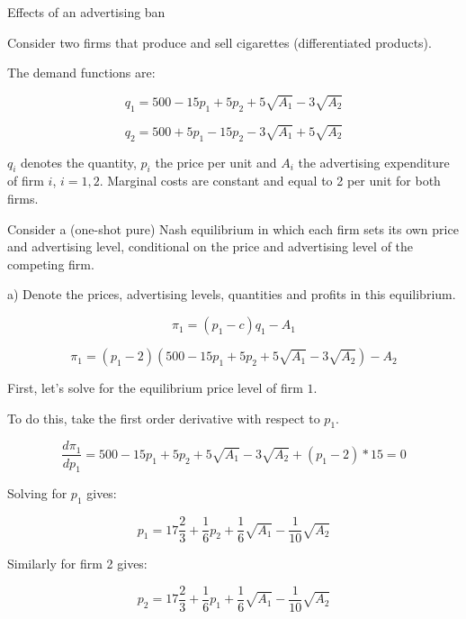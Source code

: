 \documentclass[12pt,english]{article}%
\begin{document}
Effects of an advertising ban

Consider two firms that produce and sell cigarettes (differentiated products).

The demand functions are:

\begin{equation}
q_1=500-15p_1+5p_2+5\sqrt{A_1}-3\sqrt{A_2}
\end{equation}

\begin{equation}
q_2=500+5p_1-15p_2-3\sqrt{A_1}+5\sqrt{A_2}
\end{equation}

$q_i$ denotes the quantity, $p_i$ the price per unit and $A_i$ the advertising expenditure of firm $i$, $i=1,2$.
Marginal costs are constant and equal to 2 per unit for both firms. 

Consider a (one-shot pure) Nash equilibrium in which each firm sets its own price and advertising level, conditional on the price and advertising level of the competing firm. 

a) Denote the prices, advertising levels, quantities and profits in this equilibrium.

\begin{equation}
\pi_1=(p_1-c)q_1-A_1
\end{equation}

\begin{equation}
\pi_1=(p_1-2)(500-15p_1+5p_2+5\sqrt{A_1}-3\sqrt{A_2})-A_2
\end{equation}


First, let's solve for the equilibrium price level of firm $1$.
 
To do this, take the first order derivative with respect to $p_1$.

\begin{equation}
\frac{d\pi_1}{dp_1}=500-15p_1+5p_2+5\sqrt{A_1}-3\sqrt{A_2}+(p_1-2)*15=0
\end{equation}

Solving for $p_1$ gives:

\begin{equation}
p_1=17\frac{2}{3}+\frac{1}{6}p_2+\frac{1}{6}\sqrt{A_1}-\frac{1}{10}\sqrt{A_2}
\end{equation}

Similarly for firm 2 gives:

\begin{equation}
p_2=17\frac{2}{3}+\frac{1}{6}p_1+\frac{1}{6}\sqrt{A_1}-\frac{1}{10}\sqrt{A_2}
\end{equation}
\end{document}
